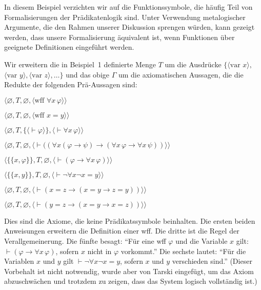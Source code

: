 In diesem Beispiel verzichten wir auf die Funktionssymbole, die häufig Teil von Formalisierungen der Prädikatenlogik sind.  Unter Verwendung metalogischer Argumente, die den Rahmen unserer Diskussion sprengen würden, kann gezeigt werden, dass unsere Formalisierung äquivalent ist, wenn Funktionen über geeignete Definitionen eingeführt werden. 

Wir erweitern die in Beispiel~1 definierte Menge $T$ um die Ausdrücke $\{\langle \mbox{var\ } x\rangle,$ $ \langle \mbox{var\ } y\rangle, \langle \mbox{var\ } z\rangle,\ldots\}$ und das obige $\Gamma$ um die axiomatischen Aussagen, die die Redukte der folgenden Prä-Aussagen sind: 
\begin{list}{}{\itemsep 0.0pt}
      \item[] $\langle\varnothing,T,\varnothing,
               \langle \mbox{wff\ }\forall x\,\varphi\rangle\rangle$
      \item[] $\langle\varnothing,T,\varnothing,
               \langle \mbox{wff\ }x=y\rangle\rangle$
      \item[] $\langle\varnothing,T,
               \{\langle\vdash\varphi\rangle\},
               \langle\vdash\forall x\,\varphi\rangle\rangle$
      \item[] $\langle\varnothing,T,\varnothing,
               \langle \vdash((\forall x(\varphi\to\psi)
                  \to(\forall x\,\varphi\to\forall x\,\psi))
               \rangle\rangle$
      \item[] $\langle\{\{x,\varphi\}\},T,\varnothing,
               \langle \vdash(\varphi\to\forall x\,\varphi)
               \rangle\rangle$
      \item[] $\langle\{\{x,y\}\},T,\varnothing,
               \langle \vdash\lnot\forall x\lnot x=y
               \rangle\rangle$
      \item[] $\langle\varnothing,T,\varnothing,
               \langle \vdash(x=z
                  \to(x=y\to z=y))
               \rangle\rangle$
      \item[] $\langle\varnothing,T,\varnothing,
               \langle \vdash(y=z
                  \to(x=y\to x=z))
               \rangle\rangle$
\end{list}
Dies sind die Axiome, die keine Prädikatssymbole beinhalten. Die ersten beiden Anweisungen erweitern die Definition einer wff.  Die dritte ist die Regel der Verallgemeinerung.  Die fünfte besagt: "`Für eine wff $\varphi$ und die Variable $x$ gilt: $\vdash(\varphi\to\forall x\,\varphi)$, sofern $x$ nicht in $\varphi$ vorkommt."'  Die sechste lautet: "`Für die Variablen $x$ und $y$ gilt $\vdash\lnot\forall x\lnot x = y$, sofern $x$ und $y$ verschieden sind."' (Dieser Vorbehalt ist nicht notwendig, wurde aber von Tarski eingefügt, um das Axiom abzuschwächen und trotzdem zu zeigen, dass das System logisch vollständig ist.) 

